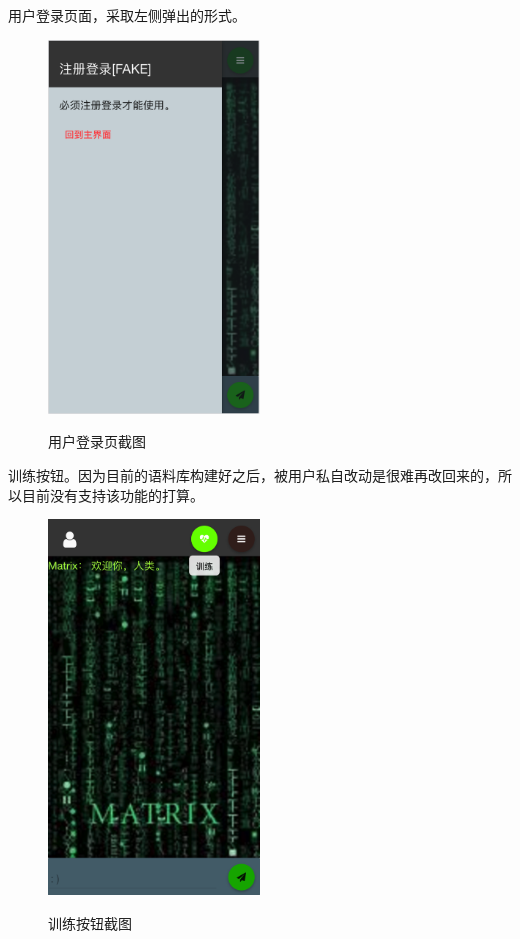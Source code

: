 \documentclass[bachelor,winfonts]{jnuthesis}
\begin{document}
用户登录页面，采取左侧弹出的形式。


\begin{figure}[H]
  \centering
  \includegraphics[width= 0.5\textwidth]{chat2.png}\\
  \caption{用户登录页截图}\label{fig:pic4}
\end{figure}


训练按钮。因为目前的语料库构建好之后，被用户私自改动是很难再改回来的，所以目前没有支持该功能的打算。

\begin{figure}[H]
  \centering
  \includegraphics[width= 0.5\textwidth]{chat3.png}\\
  \caption{训练按钮截图}\label{fig:pic4}
\end{figure}
\end{document}
